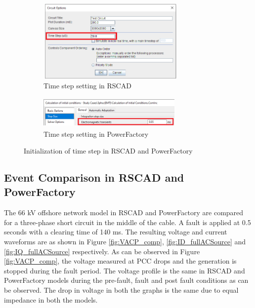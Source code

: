 \begin{figure}[H]
\centering
\begin{subfigure}{.55\textwidth}
  \centering
  \includegraphics[height=4cm,width=7.2cm]{Diagrams/Chapter_3/Stepsize_RSCAD.PNG}
  \caption{Time step setting in RSCAD}
  \label{Stepsize_RSCAD}
\end{subfigure}%
\begin{subfigure}{.45\textwidth}
  \centering
  \includegraphics[height=1.6cm,width=7cm]{Diagrams/Chapter_3/Stepsize_PFD_Zoom.PNG}
  \caption{Time step setting in PowerFactory}
  \label{Stepsize_PFD_Zoom}
\end{subfigure}
\caption{Initialization of time step in RSCAD and PowerFactory}
\label{fig:Stepsize_RSCAD_PFD}
\end{figure}

\subsection{Event Comparison in RSCAD and PowerFactory}
The 66 kV offshore network model in RSCAD and PowerFactory are compared for a three-phase short circuit in the middle of the cable. A fault is applied at 0.5 seconds with a clearing time of 140 ms. The resulting voltage and current waveforms are as shown in Figure \ref{fig:VACP_comp},  \ref{fig:ID_fullACSource} and \ref{fig:IQ_fullACSource} respectively. As can be observed in Figure \ref{fig:VACP_comp}, the voltage measured at \gls{PCC} drops and the generation is stopped during the fault period. The voltage profile is the same in RSCAD and PowerFactory models during the pre-fault, fault and post fault conditions as can be observed. The drop in voltage in both the graphs is the same due to equal impedance in both the models. 

